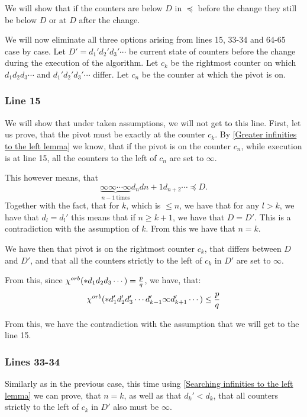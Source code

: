 We will show that if the counters are below $D$ in $\preceq$ before the change they still 
be below $D$ or at $D$ after the change. 

We will now eliminate all three options arising from lines 15, 33-34 and 64-65 case by case. 
Let $D' = d_1'd_2'd_3'\cdots$ be current state of counters before the change 
during the execution of the algorithm. 
Let $c_k$ be the rightmost counter on which $d_1d_2d_3\cdots$ 
and $d_1'd_2'd_3'\cdots$ differ. Let $c_n$ be the counter at which the pivot is on. 
\subsubsection{Line 15}
We will show that under taken assumptions, we will not get to this line. 
First, let us prove, that the pivot must be exactly at the counter $c_k$. 
By \ref{Greater infinities to the left lemma} we know, that if the pivot is 
on the counter $c_n$, while execution is at line 15, 
all the counters to the left of $c_n$ are set to $\infty$. 

This however means, that
\begin{equation}
\underbrace{\infty\infty\cdots\infty}_{n-1\ \mathrm{times}}d_nd{n+1}d_{n+2}\cdots \preceq D.
\end{equation}
Together with the fact, that for $k$, which is $\leq n$, we have that 
for any $l > k$, we have that $d_l = d_l'$ this means that if $n \geq k+1$, we have that 
$D = D'$. This is a contradiction with the assumption of $k$. 
From this we have that $n = k$.

We have then that pivot is on the rightmost counter $c_k$, 
that differs between $D$ and $D'$, and 
that all the counters strictly to the left of $c_k$ in $D'$ are set to $\infty$. 


From this, since ${\chi^{orb}(*d_1d_2d_3\cdots)} = \frac{p}{q}$, we have, that: 
\begin{equation}
{\chi^{orb}(*d_1'd_2'd_3'\cdots d_{k-1}'\infty d_{k+1}'\cdots)} \leq \frac{p}{q} 
\end{equation}

From this, we have the contradiction with the assumption that we will get to the line 15. 

\subsubsection{Lines 33-34}
Similarly as in the previous case, this time using \ref{Searching infinities to the left lemma} 
we can prove, that $n=k$, as well as that $d_k' < d_k$, that all 
counters strictly to the left of $c_k$ in $D'$ also must be $\infty$.

